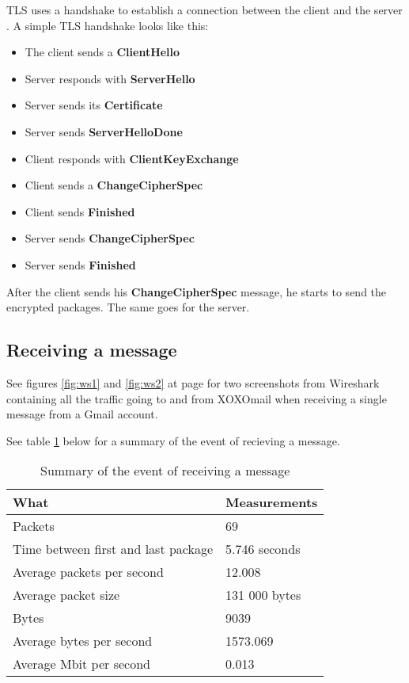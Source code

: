 TLS uses a handshake to establish a connection between the client and the server \cite{bib:tls}.
A simple TLS handshake looks like this:
\begin{itemize}
\item{}The client sends a \textbf{ClientHello}
\item{}Server responds with \textbf{ServerHello}
\item{}Server sends its \textbf{Certificate}
\item{}Server sends \textbf{ServerHelloDone}
\item{}Client responds with \textbf{ClientKeyExchange}
\item{}Client sends a \textbf{ChangeCipherSpec}
\item{}Client sends \textbf{Finished}
\item{}Server sends \textbf{ChangeCipherSpec}
\item{}Server sends \textbf{Finished}
\end{itemize}

After the client sends his \textbf{ChangeCipherSpec} message, he starts to send the encrypted packages. The same goes for the server. 

\subsection{Receiving a message}

See figures \ref{fig:ws1} and \ref{fig:ws2} at page \pageref{fig:ws1} for two screenshots from Wireshark containing all the traffic going to and from XOXOmail when receiving a single message from a Gmail account.

See table \ref{tab:summaryrecmes} below for a summary of the event of recieving a message.
\begin{table}[h!]
\begin{center}
\begin{tabular}{l|l} \hline
\textbf{What} & \textbf{Measurements} \\ \hline \hline
Packets & 69 \\
Time between first and last package & 5.746 seconds \\
Average packets per second & 12.008 \\
Average packet size & 131 000 bytes \\
Bytes & 9039 \\
Average bytes per second & 1573.069 \\
Average Mbit per second & 0.013 \\ \hline
\end{tabular}
\end{center}
\caption{Summary of the event of receiving a message} \label{tab:summaryrecmes}
\end{table}

